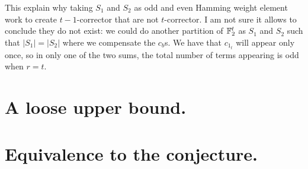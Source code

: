 \documentclass[11pt]{llncs}
\begin{document}
This explain why taking $S_1$ and $S_2$ as odd and even Hamming weight element work to create $t-1$-corrector that are not $t$-corrector.
I am not sure it allows to conclude they do not exist: we could do another partition of $\mathbb{F}_2^t$ as $S_1$ and $S_2$ such that $|S_1|=|S_2|$ where we compensate the $c_b$s. We have that $c_{1_t}$ will appear only once, so in only one of the two sums, the total number of terms appearing is odd when $r=t$.

























\ifnum{}


\else


\fi

\appendix
{}
\section{A loose upper bound.}


\section{Equivalence to the conjecture.}


\end{document}
